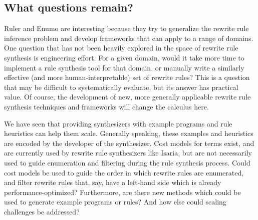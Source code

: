 \documentclass[acmsmall,screen,nonacm]{acmart}
\begin{document}


\subsection{What questions remain?}

Ruler and Enumo are interesting because they try to generalize the rewrite rule inference problem and develop frameworks that can apply to a range of domains. One question that has not been heavily explored in the space of rewrite rule synthesis is engineering effort. For a given domain, would it take more time to implement a rule synthesis tool for that domain, or manually write a similarly effective (and more human-interpretable) set of rewrite rules? This is a question that may be difficult to systematically evaluate, but its answer has practical value. Of course, the development of new, more generally applicable rewrite rule synthesis techniques and frameworks will change the calculus here.

We have seen that providing synthesizers with example programs and rule heuristics can help them scale. Generally speaking, these examples and heuristics are encoded by the developer of the synthesizer. Cost models for terms exist, and are currently used by rewrite rule synthesizers like Isaria, but are not necessarily used to guide enumeration and filtering during the rule synthesis process. Could cost models be used to guide the order in which rewrite rules are enumerated, and filter rewrite rules that, say, have a left-hand side which is already performance-optimized? Furthermore, are there new methods which could be used to generate example programs or rules? And how else could scaling challenges be addressed?
\end{document}

